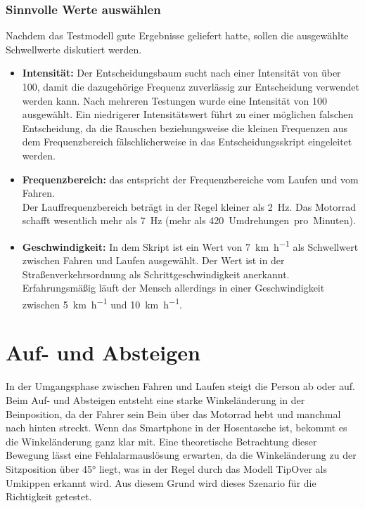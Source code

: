 \subsubsection{Sinnvolle Werte auswählen}
Nachdem das Testmodell gute Ergebnisse geliefert hatte, sollen die ausgewählte Schwellwerte diskutiert werden.
\begin{itemize}
	\item \textbf{Intensität:} Der Entscheidungsbaum sucht nach einer Intensität von über 100, damit die dazugehörige Frequenz zuverlässig zur Entscheidung verwendet werden kann. Nach mehreren Testungen wurde eine Intensität von 100 ausgewählt. Ein niedrigerer Intensitätswert führt zu einer möglichen falschen Entscheidung, da die Rauschen beziehungsweise die kleinen Frequenzen aus dem Frequenzbereich fälschlicherweise in das Entscheidungsskript eingeleitet werden.
	\item \textbf{Frequenzbereich:} das entspricht der Frequenzbereiche vom Laufen und vom Fahren.\\
	Der Lauffrequenzbereich beträgt in der Regel kleiner als \SI{2}{\hertz}. Das Motorrad schafft wesentlich mehr als \SI{7}{\hertz} (mehr als \SI{420}{Umdrehungen pro Minuten}). 
	\item \textbf{Geschwindigkeit:} In dem Skript ist ein Wert von \SI[per-mode = symbol]{7}{\kilo\meter\per\hour} als Schwellwert zwischen Fahren und Laufen ausgewählt. Der Wert ist in der Straßenverkehrsordnung als Schrittgeschwindigkeit anerkannt\citep{Bussgeldkataloge2022}. Erfahrungsmäßig läuft der Mensch allerdings in einer Geschwindigkeit zwischen \SI[per-mode = symbol]{5}{\kilo\meter\per\hour} und \SI[per-mode = symbol]{10}{\kilo\meter\per\hour}.
\end{itemize}



\section{Auf- und Absteigen} \label{sec:AufAbsteigen}
In der Umgangsphase zwischen Fahren und Laufen steigt die Person ab oder auf. Beim Auf- und Absteigen entsteht eine starke Winkeländerung in der Beinposition, da der Fahrer sein Bein über das Motorrad hebt und manchmal nach hinten streckt. Wenn das Smartphone in der Hosentasche ist, bekommt es die Winkeländerung ganz klar mit.
Eine theoretische Betrachtung dieser Bewegung lässt eine Fehlalarmauslösung erwarten, da die Winkeländerung zu der Sitzposition über \ang{45} liegt, was in der Regel durch das Modell \glqq TipOver\grqq{} als Umkippen erkannt wird.
Aus diesem Grund wird dieses Szenario für die Richtigkeit getestet.


